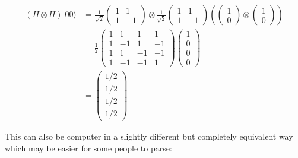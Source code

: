 \documentclass[11pt]{article}
\begin{document}
\begin{align}
(H \otimes H)|00\rangle &= 
\frac{1}{\sqrt{2}}
\begin{pmatrix}
1 & 1 \\
1 & -1
\end{pmatrix} \otimes 
\frac{1}{\sqrt{2}}
\begin{pmatrix}
1 & 1 \\
1 & -1
\end{pmatrix} 
\left(
\begin{pmatrix}
1 \\ 0
\end{pmatrix} \otimes 
\begin{pmatrix}
1 \\ 0
\end{pmatrix}
\right) \\
&= \frac{1}{2}
\begin{pmatrix}
1 & 1 & 1 & 1 \\
1 & -1 & 1 & -1 \\
1 & 1  & -1 & -1 \\
1 & -1 & -1 & 1
\end{pmatrix}
\begin{pmatrix}
1 \\ 0 \\ 0 \\ 0
\end{pmatrix} \\
&= \begin{pmatrix} 1/2 \\ 1/2 \\ 1/2 \\ 1/2 \end{pmatrix}
\end{align}

    This can also be computer in a slightly different but completely
equivalent way which may be easier for some people to parse:
\end{document}
